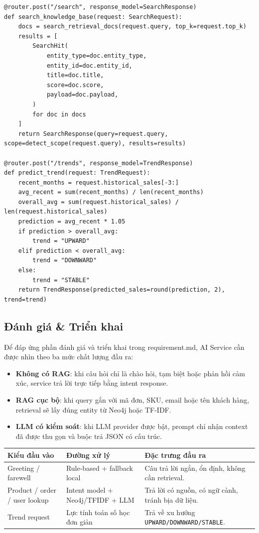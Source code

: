 \documentclass[12pt,a4paper]{article}
\begin{document}
\begin{lstlisting}[style=code,caption={Endpoint search và trend trong AI Service}]
@router.post("/search", response_model=SearchResponse)
def search_knowledge_base(request: SearchRequest):
    docs = search_retrieval_docs(request.query, top_k=request.top_k)
    results = [
        SearchHit(
            entity_type=doc.entity_type,
            entity_id=doc.entity_id,
            title=doc.title,
            score=doc.score,
            payload=doc.payload,
        )
        for doc in docs
    ]
    return SearchResponse(query=request.query, scope=detect_scope(request.query), results=results)

@router.post("/trends", response_model=TrendResponse)
def predict_trend(request: TrendRequest):
    recent_months = request.historical_sales[-3:]
    avg_recent = sum(recent_months) / len(recent_months)
    overall_avg = sum(request.historical_sales) / len(request.historical_sales)
    prediction = avg_recent * 1.05
    if prediction > overall_avg:
        trend = "UPWARD"
    elif prediction < overall_avg:
        trend = "DOWNWARD"
    else:
        trend = "STABLE"
    return TrendResponse(predicted_sales=round(prediction, 2), trend=trend)
\end{lstlisting}

\subsection{Đánh giá \& Triển khai}
Để đáp ứng phần đánh giá và triển khai trong requirement.md, AI Service cần được nhìn theo ba mức chất lượng đầu ra:
\begin{itemize}
  \item \textbf{Không có RAG}: khi câu hỏi chỉ là chào hỏi, tạm biệt hoặc phản hồi cảm xúc, service trả lời trực tiếp bằng intent response.
  \item \textbf{RAG cục bộ}: khi query gắn với mã đơn, SKU, email hoặc tên khách hàng, retrieval sẽ lấy đúng entity từ Neo4j hoặc TF-IDF.
  \item \textbf{LLM có kiểm soát}: khi LLM provider được bật, prompt chỉ nhận context đã được thu gọn và buộc trả JSON có cấu trúc.
\end{itemize}

\begin{longtable}{p{4.2cm}p{3.6cm}p{4.8cm}}
\toprule
\textbf{Kiểu đầu vào} & \textbf{Đường xử lý} & \textbf{Đặc trưng đầu ra} \\
\midrule
Greeting / farewell & Rule-based + fallback local & Câu trả lời ngắn, ổn định, không cần retrieval. \\
Product / order / user lookup & Intent model + Neo4j/TFIDF + LLM & Trả lời có nguồn, có ngữ cảnh, tránh bịa dữ liệu. \\
Trend request & Lực tính toán số học đơn giản & Trả về xu hướng \texttt{UPWARD/DOWNWARD/STABLE}. \\
\bottomrule
\end{longtable}
\end{document}
